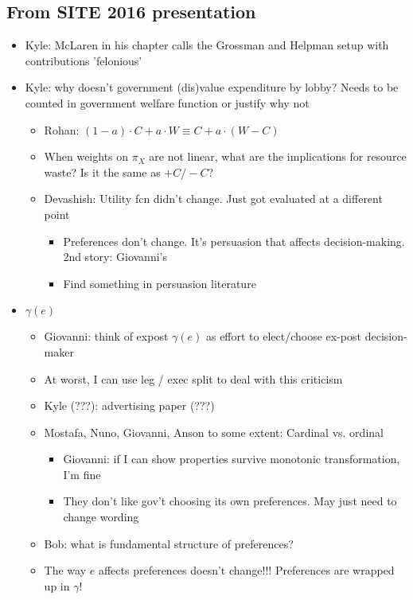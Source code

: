 \documentclass[12pt]{article}
\newcommand{\ga}{\gamma}
\begin{document}
\subsection{From SITE 2016 presentation}
\begin{itemize}
	\item Kyle: McLaren in his chapter calls the Grossman and Helpman setup with contributions 'felonious'
	\item Kyle: why doesn't government (dis)value expenditure by lobby? Needs to be counted in government welfare function or justify why not
		\begin{itemize}
			\item Rohan: $(1-a)\cdot C + a \cdot W \equiv C + a \cdot (W-C)$
			\item When weights on $\pi_X$ are not linear, what are the implications for resource waste? Is it the same as $+ C / - C$?
			\item Devashish: Utility fcn didn't change. Just got evaluated at a different point
				\begin{itemize}
					\item Preferences don't change. It's persuasion that affects decision-making. 2nd story: Giovanni's
					\item Find something in persuasion literature
				\end{itemize}
		\end{itemize}
	\item $\ga(e)$
		\begin{itemize}
			\item Giovanni: think of expost $\ga(e)$ as effort to elect/choose ex-post decision-maker
			\item At worst, I can use leg / exec split to deal with this criticism
			\item Kyle (???): advertising paper (???)
			\item Mostafa, Nuno, Giovanni, Anson to some extent: Cardinal vs. ordinal
				\begin{itemize}
					\item Giovanni: if I can show properties survive  monotonic transformation, I'm fine
					\item They don't like gov't choosing its own preferences. May just need to change wording
				\end{itemize}
			\item Bob: what is fundamental structure of preferences?
			\item The way $e$ affects preferences doesn't change!!! Preferences are wrapped up in $\ga$!

\end{itemize}
\end{itemize}
\end{document}
